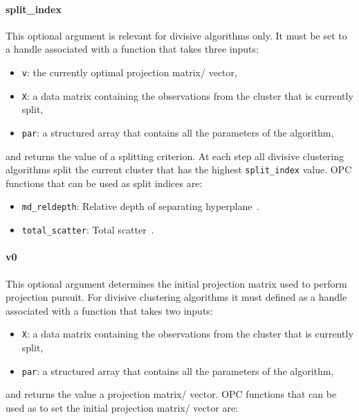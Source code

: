 \documentclass{book}
\begin{document}
\paragraph{split\_index}
%
This optional argument is relevant for divisive algorithms only.
It must be set to a handle associated with a function that 
takes three inputs:
%
\begin{itemize}

\item[] {\tt v}: the currently optimal projection matrix/ vector,

\item[] {\tt X}: a data matrix containing the observations from the cluster that is currently split,

\item[] {\tt par}: a structured array that contains all the parameters of the algorithm,

\end{itemize}
%
and returns the value of a splitting criterion. At each step
all divisive clustering algorithms split the current cluster that has the highest
{\tt split\_index} value.
%
OPC functions that can be used as split indices are:
%
\begin{itemize}

\item {\tt md\_reldepth}: Relative depth of separating hyperplane~\cite{PavlidisHT2016}.

\item {\tt total\_scatter}: Total scatter~\cite{Boley1998}.

\end{itemize}

\paragraph{v0}
%
This optional argument determines the initial projection matrix used to
perform projection pursuit. For divisive clustering algorithms it must
defined as a handle associated with a function that takes two inputs:
%
\begin{itemize}
	
\item[] {\tt X}: a data matrix containing the observations from the cluster that is currently split,

\item[] {\tt par}: a structured array that contains all the parameters of the algorithm,

\end{itemize}
%
and returns the value a projection matrix/ vector. 
%
OPC functions that can be used as to set the initial projection matrix/ vector are:
\end{document}
